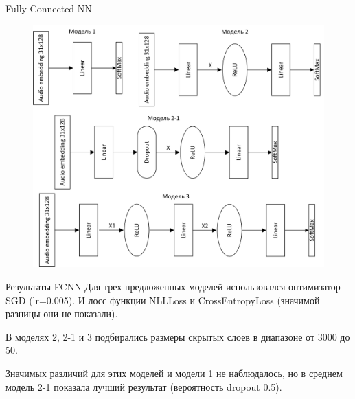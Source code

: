 \documentclass[c, aspectratio = 43]{beamer}
\begin{document}
    \begin{frame}{Fully Connected NN}
        \begin{figure}[h]
            \includegraphics[scale=0.4]{FCNN.png}
        \end{figure}

    \end{frame}


    \begin{frame}{Результаты  FCNN}
        Для трех предложенных моделей использовался оптимизатор SGD (lr=0.005). И лосс функции NLLLoss и CrossEntropyLoss (значимой разницы они не показали).
        \vspace{0.5cm}

        В моделях 2, 2-1 и 3 подбирались размеры скрытых слоев в диапазоне от 3000 до 50.
        \vspace{0.5cm}

        Значимых различий для этих моделей и модели 1 не наблюдалось, но в среднем модель 2-1 показала лучший результат (вероятность dropout 0.5).

    \end{frame}
\end{document}

